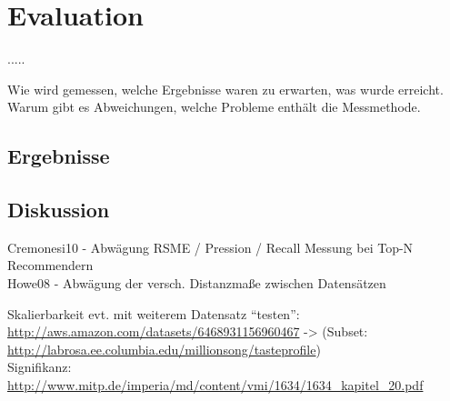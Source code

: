 \section{Evaluation}\label{sec:evaluation}\newpage.\newpage\newpage.\newpage\newpage.\newpage\newpage.\newpage\newpage.\newpage

	Wie wird gemessen, welche Ergebnisse waren zu erwarten, was wurde erreicht. Warum gibt es Abweichungen, welche Probleme enthält die Messmethode.
	
\subsection{Ergebnisse}
\subsection{Diskussion}

Cremonesi10 - Abwägung RSME / Pression / Recall Messung bei Top-N Recommendern \\
Howe08 - Abwägung der versch. Distanzmaße zwischen Datensätzen

Skalierbarkeit evt. mit weiterem Datensatz ``testen'': \\
\url{http://aws.amazon.com/datasets/6468931156960467} -> (Subset: \url{http://labrosa.ee.columbia.edu/millionsong/tasteprofile}) \\

Signifikanz: \url{http://www.mitp.de/imperia/md/content/vmi/1634/1634_kapitel_20.pdf}